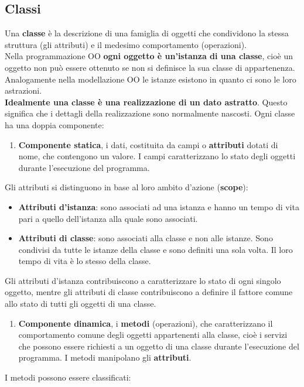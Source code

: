 \documentclass{article}
\begin{document}
	\subsection{Classi}
	Una \textbf{classe} è la descrizione di una famiglia di oggetti che condividono la stessa struttura (gli attributi) e il medesimo comportamento (operazioni). \\
	Nella programmazione OO \textbf{ogni oggetto è un'istanza di una classe}, cioè un oggetto non può essere ottenuto se non si definisce la sua classe di appartenenza. Analogamente nella modellazione OO le istanze esistono in quanto ci sono le loro astrazioni.\\
	\textbf{Idealmente una classe è una realizzazione di un dato astratto}. Questo significa che i dettagli della realizzazione sono normalmente nascosti. Ogni classe ha una doppia componente:
	\begin{enumerate}
		\item \textbf{Componente statica}, i dati, costituita da campi o \textbf{attributi} dotati di nome, che contengono un valore. I campi caratterizzano lo stato degli oggetti durante l'esecuzione del programma.\\
	\end{enumerate}
	Gli attributi si distinguono in base al loro ambito d'azione (\textbf{scope}):
	\begin{itemize}
		\item \textbf{Attributi d'istanza}: sono associati ad una istanza e hanno un tempo di vita pari a quello dell'istanza alla quale sono associati.
		\item \textbf{Attributi di classe}: sono associati alla classe e non alle istanze. Sono condivisi da tutte le istanze della classe e sono definiti una sola volta. Il loro tempo di vita è lo stesso della classe.
	\end{itemize}
	Gli attributi d'istanza contribuiscono a caratterizzare lo stato di ogni singolo oggetto, mentre gli attributi di classe contribuiscono a definire il fattore comune allo stato di tutti gli oggetti di una classe.
	\begin{enumerate}[start=2]
		\item \textbf{Componente dinamica}, i \textbf{metodi} (operazioni), che caratterizzano il comportamento comune degli oggetti appartenenti alla classe, cioè i servizi che possono essere richiesti a un oggetto di una classe durante l'esecuzione del programma. I metodi manipolano gli \textbf{attributi}.
	\end{enumerate}
	I metodi possono essere classificati:
\end{document}
